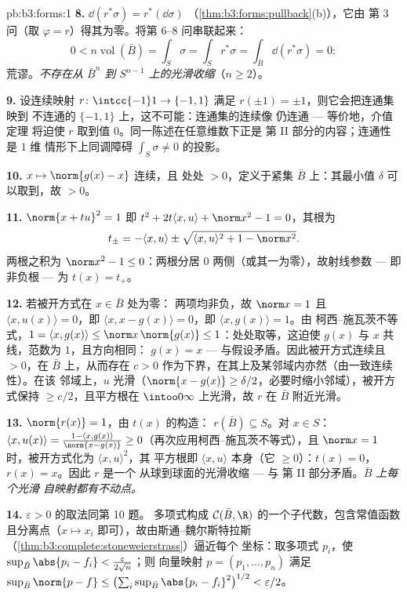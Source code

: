 \begin{solution}{pb:b3:forms:1}
\textbf{8.} $\dd(r^*\sigma) = r^*(\dd\sigma)$
（\cref{thm:b3:forms:pullback}(b)），它由
第 3 问（取 $\varphi = r$）得其为零。将第
6--8 问串联起来：
\[
0 < n\operatorname{vol}(\bar B) = \int_S\sigma =
\int_Sr^*\sigma = \int_{\bar B}\dd(r^*\sigma) = 0 :
\]
荒谬。\emph{不存在从 $\bar B^n$
到 $S^{n-1}$ 上的光滑收缩}（$n \geq 2$）。

\textbf{9.} 设连续映射 $r\colon\intcc{-1}1\to\{-1,1\}$
满足 $r(\pm1) = \pm1$，则它会把连通集映到
不连通的 $\{-1, 1\}$ 上，这不可能：连通集的连续像
仍连通 --- 等价地，介值定理
将迫使 $r$ 取到值
$0$。同一陈述在任意维数下正是
第 II 部分的内容；连通性是 $1$ 维
情形下上同调障碍 $\int_S\sigma \neq 0$ 的投影。

\textbf{10.} $x \mapsto \norm{g(x) - x}$ 连续，且
处处 $> 0$，定义于紧集 $\bar B$ 上：其最小值
$\delta$ 可以取到，故 $> 0$。

\textbf{11.} $\norm{x + tu}^2 = 1$ 即 $t^2 + 2t\langle x,
u\rangle + \norm x^2 - 1 = 0$，其根为
\[
t_\pm = -\langle x, u\rangle \pm \sqrt{\langle x,
u\rangle^2 + 1 - \norm x^2} .
\]
两根之积为 $\norm x^2 - 1 \leq 0$：两根分居
$0$ 两侧（或其一为零），故射线参数 ---
即非负根 --- 为 $t(x) = t_+$。

\textbf{12.} 若被开方式在 $x \in \bar B$ 处为零：
两项均非负，故 $\norm x = 1$ 且
$\langle x, u(x)\rangle = 0$，即 $\langle x, x -
g(x)\rangle = 0$，即 $\langle x, g(x)\rangle = 1$。由
柯西–施瓦茨不等式，$1 = \langle x, g(x)\rangle \leq
\norm x\,\norm{g(x)} \leq 1$：处处取等，这迫使
$g(x)$ 与 $x$ 共线，范数为 $1$，且方向相同：
$g(x) = x$ --- 与假设矛盾。因此被开方式连续且
$> 0$，在 $\bar B$ 上，从而存在 $c > 0$
作为下界，在其上及某邻域内亦然（由一致连续性）。在该
邻域上，$u$ 光滑（$\norm{x - g(x)} \geq
\delta/2$，必要时缩小邻域），被开方式保持 $\geq
c/2$，且平方根在 $\intoo0\infty$ 上光滑，故 $r$
在 $\bar B$ 附近光滑。

\textbf{13.} $\norm{r(x)} = 1$，由 $t(x)$ 的构造：
$r(\bar B) \subseteq S$。对 $x \in S$：$\langle x,
u(x)\rangle = \frac{1 - \langle x, g(x)\rangle}{\norm{x -
g(x)}} \geq 0$（再次应用柯西–施瓦茨不等式），且 $\norm x =
1$ 时，被开方式化为 $\langle x, u\rangle^2$，其
平方根即 $\langle x, u\rangle$ 本身（它 $\geq
0$）：$t(x) = 0$，$r(x) = x$。因此 $r$ 是一个
从球到球面的光滑收缩 --- 与
第 II 部分矛盾。\emph{$\bar B$ 上每个光滑
自映射都有不动点。}

\textbf{14.} $\varepsilon > 0$ 的取法同第 10 题。
多项式构成 $\mathcal C(\bar B,
\R)$ 的一个子代数，包含常值函数且分离点（$x
\mapsto x_i$ 即可），故由斯通–魏尔斯特拉斯
（\cref{thm:b3:complete:stoneweierstrass}）逼近每个
坐标：取多项式 $p_i$，使 $\sup_{\bar
B}\abs{p_i - f_i} < \frac{\varepsilon}{2\sqrt n}$；则
向量映射 $p = (p_1, \dots, p_n)$ 满足
$\sup_{\bar B}\norm{p - f} \leq
\bigl(\sum_i\sup_{\bar B}\abs{p_i - f_i}^2\bigr)^{1/2} <
\varepsilon/2$。


\end{solution}
